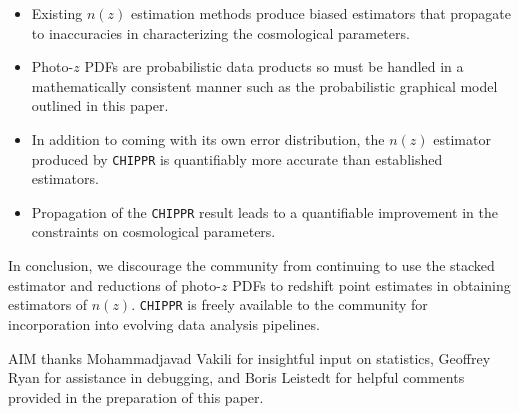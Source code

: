 \documentclass[iop]{emulateapj}
\newcommand{\chippr}{\texttt{CHIPPR} }
\begin{document}
\begin{itemize}
	\item Existing $n(z)$ estimation methods produce biased estimators that 
propagate to inaccuracies in characterizing the cosmological parameters.
	\item Photo-$z$ PDFs are probabilistic data products so must be handled 
in a mathematically consistent manner such as the probabilistic graphical model 
outlined in this paper.
	\item In addition to coming with its own error distribution, the $n(z)$ 
estimator produced by \chippr is quantifiably more accurate than established 
estimators.
	\item Propagation of the \chippr result leads to a quantifiable 
improvement in the constraints on cosmological parameters.
\end{itemize}

In conclusion, we discourage the community from continuing to use the stacked 
estimator and reductions of photo-$z$ PDFs to redshift point estimates in 
obtaining estimators of $n(z)$.  \chippr is freely available to the community 
for incorporation into evolving data analysis pipelines.  



\begin{acknowledgements}
AIM thanks Mohammadjavad Vakili for insightful input on statistics, Geoffrey 
Ryan for assistance in debugging, and Boris Leistedt for helpful comments 
provided in the preparation of this paper.
\end{acknowledgements}
\end{document}

